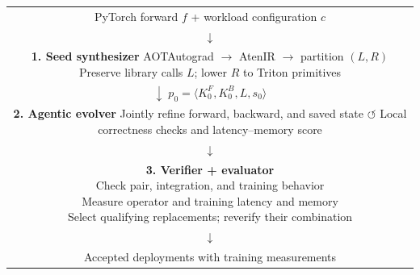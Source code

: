 \begingroup
\small
\setlength{\fboxsep}{5pt}
\begin{tabular}{@{}c@{}}
PyTorch forward $f$ + workload configuration $c$ \\
$\downarrow$ \\
\fbox{\parbox{0.91\linewidth}{\centering
    \textbf{1. Seed synthesizer}\\[2pt]
    AOTAutograd $\rightarrow$ AtenIR $\rightarrow$ partition $(L,R)$\\
    Preserve library calls $L$; lower $R$ to Triton primitives
}} \\
$\downarrow\; p_0=\langle K_0^F,K_0^B,L,s_0\rangle$ \\
\fbox{\parbox{0.91\linewidth}{\centering
    \textbf{2. Agentic evolver}\\[2pt]
    Jointly refine forward, backward, and saved state\\
    $\circlearrowleft$ Local correctness checks and latency--memory score
}} \\
$\downarrow$ \\
\fbox{\parbox{0.91\linewidth}{\centering
    \textbf{3. Verifier + evaluator}\\[2pt]
    Check pair, integration, and training behavior\\
    Measure operator and training latency and memory\\
    Select qualifying replacements; reverify their combination
}} \\
$\downarrow$ \\
Accepted deployments with training measurements
\end{tabular}
\endgroup
